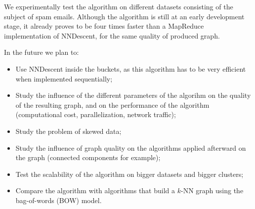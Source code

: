\documentclass[wcp]{jmlr}
\begin{document}
We experimentally test the algorithm on different datasets consisting of the subject of spam emails.  Although the algorithm is still at an early development stage, it already proves to be four times faster than a MapReduce implementation of NNDescent, for the same quality of produced graph.

In the future we plan to:
\begin{itemize}
  \item Use NNDescent inside the buckets, as this algorithm has to be very efficient when implemented sequentially;
  \item Study the influence of the different parameters of the algorihm on the quality of the resulting graph, and on the performance of the algorithm (computational cost, parallelization, network traffic);
  \item Study the problem of skewed data;
  \item Study the influence of graph quality on the algorithms applied afterward on the graph (connected components for example);
  \item Test the scalability of the algorithm on bigger datasets and bigger clusters;
  \item Compare the algorithm with algorithms that build a $k$-NN graph using the bag-of-words (BOW) model.
\end{itemize}



\end{document}
